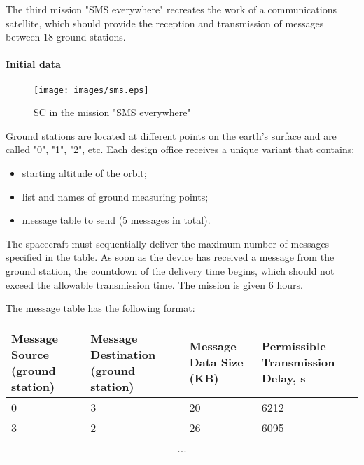 \documentclass[12pt,a4paper]{article}
\begin{document}
The third mission "SMS everywhere" recreates the work of a communications satellite, which should provide the reception and transmission of messages between 18 ground stations.

\paragraph{Initial data}

\begin{figure}[tbh]
  \begin{center}
    \texttt{[image: images/sms.eps]}
    \caption{SC in the mission "SMS everywhere"}
    \label{Pic:SMS}
  \end{center}
\end{figure}

Ground stations are located at different points on the earth's surface and are called "0", "1", "2", etc. Each design office receives a unique variant that contains:

\begin{itemize}
\item starting altitude of the orbit;
\item list and names of ground measuring points;
\item message table to send (5 messages in total).
\end{itemize}

The spacecraft must sequentially deliver the maximum number of messages specified in the table. As soon as the device has received a message from the ground station, the countdown of the delivery time begins, which should not exceed the allowable transmission time. The mission is given 6 hours.

The message table has the following format:

\begin{center}
  \begin{tabular}{|p{3.5cm}|p{3.5cm}|p{3.5cm}|p{3.5cm}|}
    \hline
    \textbf{Message Source (ground station)} & \textbf{Message Destination (ground station)} & \textbf{Message Data Size (KB)} & \textbf{Permissible Transmission Delay, s}\\
    \hline
    0 & 3 & 20 & 6212\\
    \hline
    3 & 2 & 26 & 6095\\
    \hline
    \multicolumn{4}{|c|}{...}\\
    \hline
  \end{tabular}
\end{center}
\end{document}
